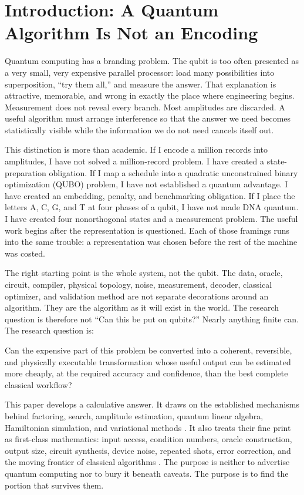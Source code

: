 \section{Introduction: A Quantum Algorithm Is Not an Encoding}

Quantum computing has a branding problem. The qubit is too often presented as a very small, very expensive parallel processor: load many possibilities into superposition, ``try them all,'' and measure the answer. That explanation is attractive, memorable, and wrong in exactly the place where engineering begins. Measurement does not reveal every branch. Most amplitudes are discarded. A useful algorithm must arrange interference so that the answer we need becomes statistically visible while the information we do not need cancels itself out.

This distinction is more than academic. If I encode a million records into amplitudes, I have not solved a million-record problem. I have created a state-preparation obligation. If I map a schedule into a quadratic unconstrained binary optimization (QUBO) problem, I have not established a quantum advantage. I have created an embedding, penalty, and benchmarking obligation. If I place the letters A, C, G, and T at four phases of a qubit, I have not made DNA quantum. I have created four nonorthogonal states and a measurement problem. The useful work begins after the representation is questioned. Each of those framings runs into the same trouble: a representation was chosen before the rest of the machine was costed.

The right starting point is the whole system, not the qubit. The data, oracle, circuit, compiler, physical topology, noise, measurement, decoder, classical optimizer, and validation method are not separate decorations around an algorithm. They are the algorithm as it will exist in the world. The research question is therefore not ``Can this be put on qubits?'' Nearly anything finite can. The research question is:

\begin{thesisbox}
Can the expensive part of this problem be converted into a coherent, reversible, and physically executable transformation whose useful output can be estimated more cheaply, at the required accuracy and confidence, than the best complete classical workflow?
\end{thesisbox}

This paper develops a calculative answer. It draws on the established mechanisms behind factoring, search, amplitude estimation, quantum linear algebra, Hamiltonian simulation, and variational methods \citep{shor1997,grover1997,brassard2002,harrow2009,gilyen2019,low2019,cerezo2021}. It also treats their fine print as first-class mathematics: input access, condition numbers, oracle construction, output size, circuit synthesis, device noise, repeated shots, error correction, and the moving frontier of classical algorithms \citep{aaronson2015,tang2019,tang2021,vandam2024}. The purpose is neither to advertise quantum computing nor to bury it beneath caveats. The purpose is to find the portion that survives them.

